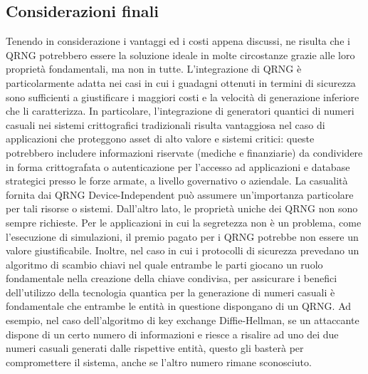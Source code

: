 \subsection{Considerazioni finali}
Tenendo in considerazione i vantaggi ed i costi appena discussi, ne risulta che i QRNG potrebbero essere la soluzione ideale in molte circostanze grazie alle loro proprietà fondamentali, ma non in tutte. L'integrazione di QRNG è particolarmente adatta nei casi in cui i guadagni ottenuti in termini di sicurezza sono sufficienti a giustificare i maggiori costi e la velocità di generazione inferiore che li caratterizza. In particolare, l'integrazione di generatori quantici di numeri casuali nei sistemi crittografici tradizionali risulta vantaggiosa nel caso di applicazioni che proteggono asset di alto valore e sistemi critici: queste potrebbero includere informazioni riservate (mediche e finanziarie) da condividere in forma crittografata o autenticazione per l'accesso ad applicazioni e database strategici presso le forze armate, a livello governativo o aziendale. La casualità fornita dai QRNG Device-Independent può assumere un'importanza particolare per tali risorse o sistemi. Dall'altro lato, le proprietà uniche dei QRNG non sono sempre richieste. Per le applicazioni in cui la segretezza non è un problema, come l'esecuzione di simulazioni, il premio pagato per i QRNG potrebbe non essere un valore giustificabile. Inoltre, nel caso in cui i protocolli di sicurezza prevedano un algoritmo di scambio chiavi nel quale entrambe le parti giocano un ruolo fondamentale nella creazione della chiave condivisa, per assicurare i benefici dell'utilizzo della tecnologia quantica per la generazione di numeri casuali è fondamentale che entrambe le entità in questione dispongano di un QRNG. Ad esempio, nel caso dell'algoritmo di key exchange Diffie-Hellman, se un attaccante dispone di un certo numero di informazioni e riesce a risalire ad uno dei due numeri casuali generati dalle rispettive entità, questo gli basterà per compromettere il sistema, anche se l'altro numero rimane sconosciuto.




